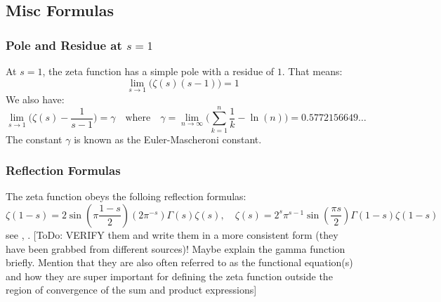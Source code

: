 \documentclass[12pt]{article}
\begin{document}
\subsection{Misc Formulas}

\subsubsection{Pole and Residue at $s=1$}
At $s = 1$, the zeta function has a simple pole with a residue of $1$. That means:
\begin{equation}
\lim_{s \rightarrow 1} \bigl( \zeta(s)  (s-1) \bigr) = 1
\end{equation}
We also have:
\begin{equation}
\lim_{s \rightarrow 1} \bigl( \zeta(s) - \frac{1}{s-1} \bigr) = \gamma
\quad \text{where} \quad
\gamma 
= \lim_{n \rightarrow \infty} \bigl( \sum_{k=1}^n \frac{1}{k} - \ln(n) \bigr)
= 0.5772156649 \ldots
\end{equation}
The constant $\gamma$ is known as the Euler-Mascheroni constant.

\subsubsection{Reflection Formulas}
The zeta function obeys the folloing reflection formulas:
\begin{equation}
\zeta(1-s) = 2 \sin(\pi \frac{1-s}{2})(2 \pi^{-s}) \Gamma(s) \zeta(s), \quad
\zeta(s) = 2^s \pi^{s-1} \sin(\frac{\pi s}{2}) \Gamma(1-s) \zeta(1-s)
\end{equation}
see \cite{Boost}, \cite{Wiki}. [ToDo: VERIFY them and write them in a more consistent form (they have been grabbed from different sources)! Maybe explain the gamma function briefly. Mention that they are also often referred to as the functional equation(s) and how they are super important for defining the zeta function outside the region of convergence of the sum and product expressions]
\end{document}
